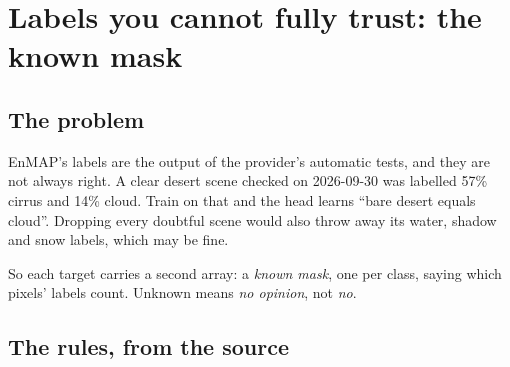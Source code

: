 \section{Labels you cannot fully trust: the known mask}\label{sec:seghead:known}

\subsection{The problem}

EnMAP's labels are the output of the provider's automatic tests, and they are not always right. A clear desert scene checked on
2026-09-30 was labelled 57\% cirrus and 14\% cloud.\tbrk{} Train on that and the head learns
``bare desert equals cloud''. Dropping every doubtful scene would also throw away its water, shadow and snow labels, which may be fine.

So each target carries a second array: a \emph{known mask}, one per class, saying which pixels' labels count. Unknown
means \emph{no opinion}, not \emph{no}.

\subsection{The rules, from the source}

